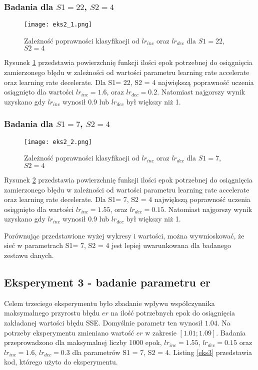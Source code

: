 \documentclass[12pt,twoside]{article}
\begin{document}
\subsubsection{Badania dla $S1=22$, $S2=4$}

\begin{figure}[H]
\centering
\texttt{[image: eks2\_1.png]}
\caption{Zależność poprawności klasyfikacji od $lr_{inc}$ oraz $lr_{dec}$ dla $S1=22$, $S2=4$}
\label{eks2_1}
\end{figure}


Rysunek \ref{eks2_1} przedstawia powierzchnię funkcji ilości epok potrzebnej do osiągnięcia zamierzonego błędu w zależności od wartości parametru learning rate accelerate oraz learning rate decelerate. Dla S1= 22, S2 = 4 największą poprawność uczenia osiągnięto dla wartości $lr_{inc}  =  1.6$, oraz $lr_{dec} = 0.2$. Natomiast najgorszy wynik uzyskano gdy $lr_{inc}$ wynosił 0.9 lub $lr_{dec}$ był większy niż 1.

\subsubsection{Badania dla $S1=7$, $S2=4$}

\begin{figure}[H]
\centering
\texttt{[image: eks2\_2.png]}
\caption{Zależność poprawności klasyfikacji od $lr_{inc}$ oraz $lr_{dec}$ dla $S1=7$, $S2=4$}
\label{eks2_2}
\end{figure}

Rysunek \ref{eks2_2} przedstawia powierzchnię funkcji ilości epok potrzebnej do osiągnięcia zamierzonego błędu w zależności od wartości parametru learning rate accelerate oraz learning rate decelerate. Dla S1= 7, S2 = 4 największą poprawność uczenia osiągnięto dla wartości $lr_{inc}  =  1.55$, oraz $lr_{dec} = 0.15$. Natomiast najgorszy wynik uzyskano gdy $lr_{inc}$ wynosił 0.9 lub $lr_{dec}$ był większy niż 1.

Porównując przedstawione wyżej wykresy i wartości, można wywnioskować, że sieć w parametrach S1= 7, S2 = 4 jest lepiej uwarunkowana dla badanego zestawu danych. 


\subsection{Eksperyment 3 - badanie parametru er}
Celem trzeciego eksperymentu było zbadanie wpływu współczynnika maksymalnego przyrostu błędu $er$ na ilość potrzebnych epok do osiągnięcia zakładanej wartości błędu SSE. Domyślnie parametr ten wynosił $1.04$. Na potrzeby eksperymentu zmieniano wartość $er$ w zakresie $[1.01; 1.09]$. Badania przeprowadzono dla maksymalnej liczby 1000 epok, $lr_{inc}  = 1.55$, $lr_{dec} = 0.15$ oraz $lr_{inc}  = 1.6$, $lr_{dec} = 0.3$ dla parametrów S1 = 7, S2 = 4. Listing \ref{eks3} przedstawia kod, którego użyto do eksperymentu.
\end{document}
